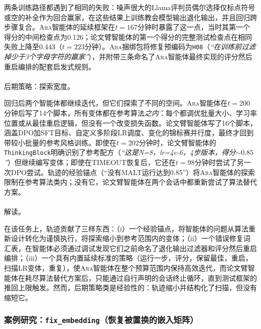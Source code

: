 \documentclass[
]{article}
\makeatletter
\let\oldparagraph\paragraph
\renewcommand{\paragraph}{
    \@ifstar
      \xxxParagraphStar
      \xxxParagraphNoStar
  }
\newcommand{\xxxParagraphStar}[1]{\oldparagraph*{#1}\mbox{}}
\newcommand{\xxxParagraphNoStar}[1]{\oldparagraph{#1}\mbox{}}
\newcommand{\passthrough}[1]{#1}
\theoremstyle{definition}
\newcommand{\ara}{\textsc{Ara}}
\makeatother
\begin{document}
两条训练路径都遇到了相同的失败：噪声很大的Llama评判员偶尔选择仅标点符号或空的补全作为回合赢家，在这些结果上训练教会模型输出退化输出，并且回归跨步骤复合。\ara{}智能体的延续框架在\(t = 167\)分钟时暴露了这一点，当时其第一个得分的中间检查点为0.126；论文臂智能体的第一个得分的完整测试检查点在相同失败上降至0.443（\(t = 223\)分钟）。\ara{}捆绑包将修复预编码为\passthrough{\lstinline!H08!}（\emph{``在训练前过滤掉少于3个字母字符的赢家''}），并附带三条命名了\ara{}智能体最终实现的评分然后重启编排的配套启发式规则。

\paragraph{后期策略：探索宽度。}\label{ux540eux671fux7b56ux7565ux63a2ux7d22ux5bbdux5ea6}

回归后两个智能体都继续迭代，但它们探索了不同的空间。\ara{}智能体在\(t = 200\)分钟后写了14个脚本，所有变体都在参考算法\emph{之内}：每个都调优批量大小、学习率位置或从最佳重启逻辑，但没有一个改变损失函数。论文臂智能体写了16个脚本，涵盖DPO加SFT目标、自定义多阶段LR调度、变化的锦标赛并行度，最终才回到带较小批量的参考风格训练。即使在\(t = 202\)分钟时，论文臂智能体的\passthrough{\lstinline!ThinkingBlock!}明确识别了参考配方（\emph{``这是N=8，lr=4e-6，4步版本，得分\({\sim}0.85\)''}）但继续编写变体；即使在TIMEOUT恢复后，它还在\(t = 98\)分钟时尝试了另一次DPO尝试。轨迹的经验锚点（``没有MALT运行达到0.85''）将\ara{}智能体的探索限制在参考算法类内；没有它，论文臂智能体在两个会话中都重新尝试了算法替代方案。

\paragraph{解读。}\label{ux89e3ux8bfb-2}

在该任务上，轨迹贡献了三样东西：（i）一个经验锚点，将智能体的问题从算法重新设计转化为谨慎执行，将探索缩小到参考范围内的变体；（ii）一个错误修复词汇表，在智能体必须通过调试发现它们之前命名了退化输出过滤器和评分然后重启编排；（iii）一个具有内置延续标准的策略（运行一步，评分，保留最佳，重启，扫描LR变体，重复），使\ara{}智能体在整个预算范围内保持高效迭代，而论文臂智能体在耗尽算法替代方案后，只能通过自行声明的会话终止循环，直到测试框架的推回上限触发。然而，后期策略类是经验性的：轨迹缩小并结构化了扫描，但没有缩短它。

\subsubsection{\texorpdfstring{案例研究：\texttt{fix\_embedding}（恢复被置换的嵌入矩阵）}{案例研究：fix\_embedding（恢复被置换的嵌入矩阵）}}\label{sec-eval-extension-fixembed}
\end{document}
